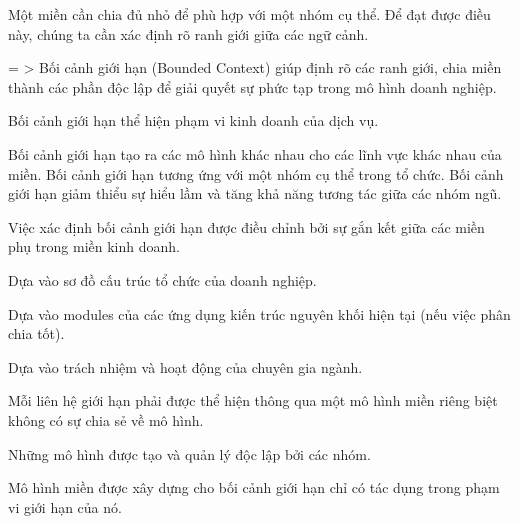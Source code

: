 


Một miền cần chia đủ nhỏ để phù hợp với một nhóm cụ thể. Để đạt được điều này, chúng ta cần xác định rõ ranh giới giữa các ngữ cảnh.

= > Bối cảnh giới hạn (Bounded Context) giúp định rõ các ranh giới, chia miền thành các phần độc lập để giải quyết sự phức tạp trong mô hình doanh nghiệp.

Bối cảnh giới hạn thể hiện phạm vi kinh doanh của dịch vụ.

Bối cảnh giới hạn   tạo ra các mô hình khác nhau cho các lĩnh vực  khác nhau của miền.
Bối cảnh giới hạn   tương ứng với một nhóm  cụ thể trong tổ chức. 
Bối cảnh giới hạn    giảm thiểu sự hiểu lầm và tăng khả năng tương tác giữa các nhóm ngũ.









Việc xác định bối cảnh giới hạn được điều chỉnh bởi sự gắn kết giữa các miền phụ trong miền kinh doanh.

Dựa vào sơ đồ cấu trúc tổ chức của doanh nghiệp.

Dựa vào modules của các ứng dụng kiến trúc nguyên khối hiện tại (nếu việc phân chia tốt).

Dựa vào trách nhiệm và hoạt động của chuyên gia ngành.


Mỗi liên hệ giới hạn phải được thể hiện thông qua một mô hình miền riêng biệt không có sự chia sẻ về mô hình.


Những mô hình được tạo và quản lý độc lập bởi các nhóm.


Mô hình miền được xây dựng cho bối cảnh giới hạn chỉ có tác dụng trong phạm vi giới hạn của nó.



